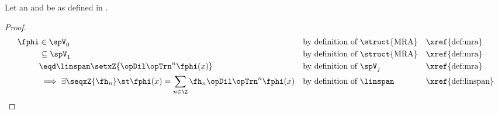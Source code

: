 \begin{theorem}
\label{thm:h->phi}
\label{thm:dilation_eq}
Let an  and  be as defined in .
\end{theorem}
\begin{proof}
  \begin{align*}
    \fphi &\in \spV_0
          && \text{by definition of \struct{MRA}} && \text{\xref{def:mra}}
        \\&\subseteq \spV_1
          && \text{by definition of \struct{MRA}} && \text{\xref{def:mra}}
        \\&\eqd \linspan\setxZ{\opDil\opTrn^n\fphi(x)}
          && \text{by definition of $\spV_j$}     && \text{\xref{def:mra}}
        \\&\implies
           \exists \seqxZ{\fh_n} \st
              \fphi(x) = \sum_{n\in\Z}\fh_n \opDil \opTrn^n \fphi(x)
          && \text{by definition of $\linspan$}   && \text{\xref{def:linspan}}
  \end{align*}
\end{proof}

